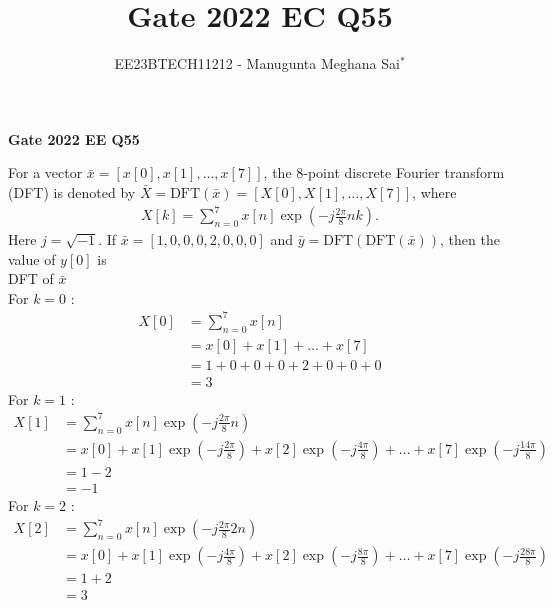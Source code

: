 \documentclass[journal,12pt,onecolumn]{IEEEtran}
\theoremstyle{remark}
\begin{document}
    
    
    \vspace{3cm}
    
    \title{Gate 2022 EC Q55}
    \author{EE23BTECH11212 - Manugunta Meghana Sai$^{*}$%
    }
    \maketitle
    \bigskip
    
    \renewcommand{\thefigure}{\theenumi}
    \renewcommand{\thetable}{\theenumi}
    
    \vspace{3cm}
    \textbf{Gate 2022 EE Q55} 
    
    For a vector $\bar{x} = [x[0], x[1], \dots, x[7] ]$, the $8$-point discrete Fourier transform (DFT) is denoted by $\bar{X} = \text{DFT}(\bar{x}) = [X[0],X[1],\dots,X[7]]$, where
    \begin{align*}
    X[k] = \sum_{n=0}^{7}x[n]\exp\left(-j\frac{2\pi}{8}nk\right).
    \end{align*} 
    Here $j = \sqrt{-1}$. If $\bar{x} = [1,0,0,0,2,0,0,0]$ and $\bar{y} = \text{DFT}(\text{DFT}(\bar{x}))$, then the value of $y[0]$ is\\
    \solution
    DFT of $\bar{x}$
    \\For $k=0$ :
    \begin{align}
    X[0] &= \sum_{n=0}^{7}x[n]\\
    &= x[0] + x[1] + \dots + x[7]\\
    &= 1 + 0 + 0 + 0 + 2 + 0 + 0 + 0\\
    &= 3
    \end{align}
    For $k=1$ :
    \begin{align}
    X[1] &= \sum_{n=0}^{7}x[n]\exp\left(-j\frac{2\pi}{8}n\right)\\
    &= x[0] + x[1]\exp\left(-j\frac{2\pi}{8}\right) + x[2]\exp\left(-j\frac{4\pi}{8}\right) + \dots + x[7]\exp\left(-j\frac{14\pi}{8}\right)\\
    &= 1 - 2  \\
    &= -1
    \end{align}
    For $k=2$ :
    \begin{align}
    X[2] &= \sum_{n=0}^{7}x[n]\exp\left(-j\frac{2\pi}{8}2n\right)\\
    &= x[0] + x[1]\exp\left(-j\frac{4\pi}{8}\right) + x[2]\exp\left(-j\frac{8\pi}{8}\right) + \dots + x[7]\exp\left(-j\frac{28\pi}{8}\right)\\
    &= 1 + 2  \\
    &= 3
    \end{align}
\end{document}
